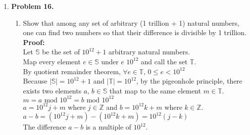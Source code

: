 \documentclass[letterpaper,fleqn]{article}
\begin{document}
\begin{enumerate}
		\item [] \textbf{Problem 16.}
		\begin{enumerate}
			\item [] Show that among any set of arbitrary (1 trillion + 1) natural numbers, one can find two numbers so that their difference is divisible by 1 trillion. \\
			\textbf{Proof:} \\
			Let $\mathbb{S}$ be the set of $10^{12}+1$ arbitrary natural numbers. \\
			Map every element $e \in \mathbb{S}$ under $e$  $10^{12}$ and call the set $\mathbb{T}$. \\
			By quotient remainder theorem, $\forall e \in \mathbb{T},\, 0 \leq e < 10^{12}$ \\
			Because $|\mathbb{S}|=10^{12}+1$ and $|\mathbb{T}|=10^{12}$, by the pigeonhole principle, there exists two elements $a,\, b \in \mathbb{S}$ that map to the same element $m \in \mathbb{T}$. \\
			$m=a\text{ mod }10^{12} = b\text{ mod }10^{12}$ \\
			$a=10^{12}j+m$ where $j \in \mathbb{Z}$ and $b=10^{12}k+m$ where $k \in \mathbb{Z}$. \\
			$a-b = (10^{12}j+m)-(10^{12}k+m)=10^{12}(j-k)$ \\
			The difference $a-b$ is a multiple of $10^{12}$. \\
		\end{enumerate}
		
	\end{enumerate}
\end{document}
